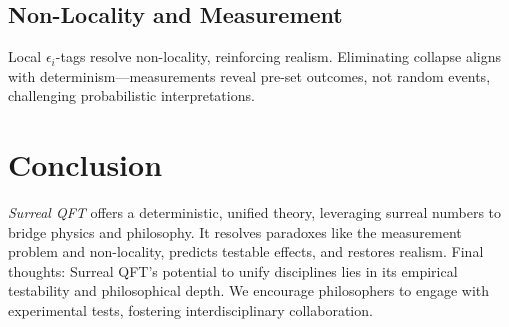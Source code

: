 \documentclass{article}
\begin{document}
\subsection{Non-Locality and Measurement}
Local \(\epsilon_i\)-tags resolve non-locality, reinforcing realism. Eliminating collapse aligns with determinism---measurements reveal pre-set outcomes, not random events, challenging probabilistic interpretations.

\section{Conclusion}
\textit{Surreal QFT} offers a deterministic, unified theory, leveraging surreal numbers to bridge physics and philosophy. It resolves paradoxes like the measurement problem and non-locality, predicts testable effects, and restores realism. Final thoughts: Surreal QFT's potential to unify disciplines lies in its empirical testability and philosophical depth. We encourage philosophers to engage with experimental tests, fostering interdisciplinary collaboration.
\end{document}
